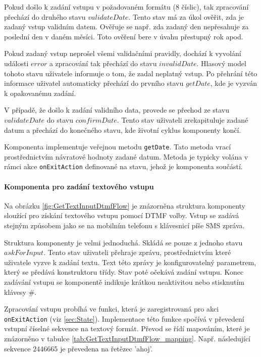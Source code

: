 \documentclass[ing,male,java,dept460]{diploma}						%
\begin{document}
Pokud došlo k zadání vstupu v požadovaném formátu (8 číslic), tak zpracování přechází do druhého stavu $validateDate$. Tento stav má za úkol ověřit, zda je zadaný vstup validním datem. Ověřuje se např. zda zadaný den nepřesahuje za poslední den v daném měsíci. Toto ověření bere v úvahu přestupný rok apod.

Pokud zadaný vstup neprošel všemi validačními pravidly, dochází k vyvolání události $error$ a zpracování tak přechází do stavu $invalidDate$. Hlasový model tohoto stavu uživatele informuje o tom, že zadal neplatný vstup. Po přehrání této informace uživatel automaticky přechází do prvního stavu $getDate$, kde je vyzván k opakovanému zadání.

V případě, že došlo k zadání validního data, provede se přechod ze stavu $validateDate$ do stavu $confirmDate$. Tento stav uživateli zrekapituluje zadané datum a přechází do konečného stavu, kde životní cyklus komponenty končí.

Komponenta implementuje veřejnou metodu \texttt{getDate}. Tato metoda vrací prostřednictvím návratové hodnoty zadané datum. Metoda je typicky volána v rámci akce \texttt{onExitAction} definované na stavu, jehož je komponenta součástí.


\paragraph{Komponenta pro zadání textového vstupu}
\label{sec:GetTextInputDtmfFlow}
Na obrázku \ref{fig:GetTextInputDtmfFlow} je znázorněna struktura komponenty sloužící pro získání textového vstupu pomocí DTMF volby. Vstup se zadává stejným způsobem jako se na mobilním telefonu s klávesnicí píše SMS zpráva.

Struktura komponenty je velmi jednoduchá. Skládá se pouze z jednoho stavu $askForInput$. Tento stav uživateli přehraje zprávu, prostřednictvím které uživatele vyzve k zadání textu. Text této zprávy je konfigurovatelný parametrem, který se předává konstruktoru třídy. Stav poté očekává zadání vstupu. Konec zadávání vstupu se komponentě indikuje krátkou neaktivitou nebo stisknutím klávesy #.

Zpracování vstupu probíhá ve funkci, která je zaregistrovaná pro akci \texttt{onExitAction} (viz \ref{sec:State}). Implementace této funkce spočívá v převedení vstupní číselné sekvence na textový formát. Převod se řídí mapováním, které je znázorněno v tabulce \ref{tab:GetTextInputDtmfFlow_mapping}. Např. následující sekvence 2446665 je převedena na řetězec 'ahoj'.
\end{document}

